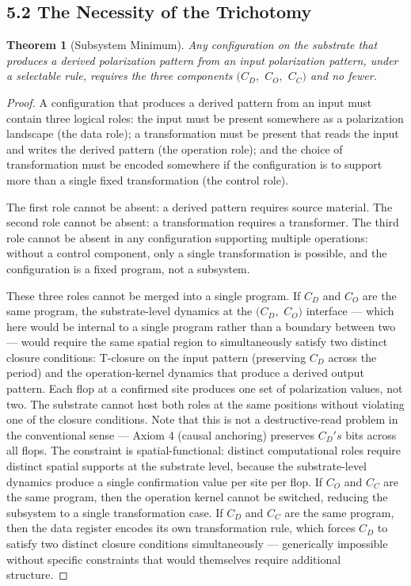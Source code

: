 \documentclass[11pt,oneside]{report}
\newtheorem{theorem}{Theorem}[section]
\theoremstyle{definition}
\theoremstyle{remark}
\begin{document}
\subsection*{5.2 The Necessity of the Trichotomy}

\begin{theorem}[Subsystem Minimum]
Any configuration on the substrate that
produces a derived polarization pattern from an input polarization
pattern, under a selectable rule, requires the three components \ensuremath{(C_{D},}
\ensuremath{C_{O},} \ensuremath{C_{C})} and no fewer.
\end{theorem}

\begin{proof}
A configuration that produces a derived pattern from an input
must contain three logical roles: the input must be present somewhere as
a polarization landscape (the data role); a transformation must be
present that reads the input and writes the derived pattern (the
operation role); and the choice of transformation must be encoded
somewhere if the configuration is to support more than a single fixed
transformation (the control role).

The first role cannot be absent: a derived pattern requires source
material. The second role cannot be absent: a transformation requires a
transformer. The third role cannot be absent in any configuration
supporting multiple operations: without a control component, only a
single transformation is possible, and the configuration is a fixed
program, not a subsystem.

These three roles cannot be merged into a single program. If \ensuremath{C_{D}} and
\ensuremath{C_{O}} are the same program, the substrate-level dynamics at the \ensuremath{(C_{D},}
\ensuremath{C_{O})} interface --- which here would be internal to a single program
rather than a boundary between two --- would require the same spatial
region to simultaneously satisfy two distinct closure conditions:
T-closure on the input pattern (preserving \ensuremath{C_{D}} across the period) and
the operation-kernel dynamics that produce a derived output pattern.
Each flop at a confirmed site produces one set of polarization values,
not two. The substrate cannot host both roles at the same positions
without violating one of the closure conditions. Note that this is not a
destructive-read problem in the conventional sense --- Axiom 4 (causal
anchoring) preserves \ensuremath{C_{D}'s} bits across all flops. The constraint is
spatial-functional: distinct computational roles require distinct
spatial supports at the substrate level, because the substrate-level
dynamics produce a single confirmation value per site per flop. If \ensuremath{C_{O}}
and \ensuremath{C_{C}} are the same program, then the operation kernel cannot be
switched, reducing the subsystem to a single transformation case. If
\ensuremath{C_{D}} and \ensuremath{C_{C}} are the same program, then the data register encodes its
own transformation rule, which forces \ensuremath{C_{D}} to satisfy two distinct
closure conditions simultaneously --- generically impossible without
specific constraints that would themselves require additional structure.


\end{proof}
\end{document}
